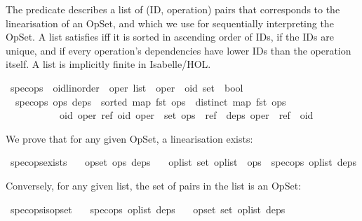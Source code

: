 The  predicate describes a list of (ID, operation) pairs that corresponds to the linearisation of an OpSet, and which we use for sequentially interpreting the OpSet.
A list satisfies  iff it is sorted in ascending order of IDs, if the IDs are unique, and if every operation's dependencies have lower IDs than the operation itself.
A list is implicitly finite in Isabelle/HOL.

\begin{isabelle}
\isamarkupfalse%
\ spec{\isacharunderscore}ops\ {\isacharcolon}{\isacharcolon}\ {\isachardoublequoteopen}{\isacharparenleft}{\isacharprime}oid{\isacharcolon}{\isacharcolon}{\isacharbraceleft}linorder{\isacharbraceright}\ {\isasymtimes}\ {\isacharprime}oper{\isacharparenright}\ list\ {\isasymRightarrow}\ {\isacharparenleft}{\isacharprime}oper\ {\isasymRightarrow}\ {\isacharprime}oid\ set{\isacharparenright}\ {\isasymRightarrow}\ bool{\isachardoublequoteclose}\ \isanewline
\ \ {\isachardoublequoteopen}spec{\isacharunderscore}ops\ ops\ deps\ {\isasymequiv}\ {\isacharparenleft}sorted\ {\isacharparenleft}map\ fst\ ops{\isacharparenright}\ {\isasymand}\ distinct\ {\isacharparenleft}map\ fst\ ops{\isacharparenright}\ {\isasymand}\isanewline
\ \ \ \ \ \ \ \ \ \ \ {\isacharparenleft}{\isasymforall}oid\ oper\ ref{\isachardot}\ {\isacharparenleft}oid{\isacharcomma}\ oper{\isacharparenright}\ {\isasymin}\ set\ ops\ {\isasymand}\ ref\ {\isasymin}\ deps\ oper\ {\isasymlongrightarrow}\ ref\ {\isacharless}\ oid{\isacharparenright}{\isacharparenright}{\isachardoublequoteclose}
\end{isabelle}
\noindent We prove that for any given OpSet, a  linearisation exists:
\begin{isabelle}
\isamarkupfalse%
\ spec{\isacharunderscore}ops{\isacharunderscore}exists{\isacharcolon}\isanewline
\ \ \ {\isachardoublequoteopen}opset\ ops\ deps{\isachardoublequoteclose}\isanewline
\ \ \ {\isachardoublequoteopen}{\isasymexists}op{\isacharunderscore}list{\isachardot}\ set\ op{\isacharunderscore}list\ {\isacharequal}\ ops\ {\isasymand}\ spec{\isacharunderscore}ops\ op{\isacharunderscore}list\ deps{\isachardoublequoteclose}
\end{isabelle}
\noindent Conversely, for any given  list, the set of pairs in the list is an OpSet:
\begin{isabelle}
\isamarkupfalse%
\ spec{\isacharunderscore}ops{\isacharunderscore}is{\isacharunderscore}opset{\isacharcolon}\isanewline
\ \ \ {\isachardoublequoteopen}spec{\isacharunderscore}ops\ op{\isacharunderscore}list\ deps{\isachardoublequoteclose}\isanewline
\ \ \ {\isachardoublequoteopen}opset\ {\isacharparenleft}set\ op{\isacharunderscore}list{\isacharparenright}\ deps{\isachardoublequoteclose}
\end{isabelle}

